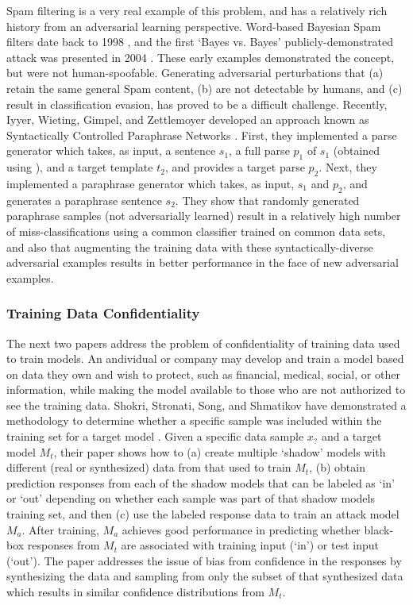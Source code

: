 \documentclass[11pt]{article}
\begin{document}
Spam filtering is a very real example of this problem, and has a relatively rich history from an adversarial learning perspective.  Word-based Bayesian Spam filters date back to 1998 \cite{sahami1998bayesian}, and the first `Bayes vs. Bayes' publicly-demonstrated attack was presented in 2004 \cite{graham2004beat}.  These early examples demonstrated the concept, but were not human-spoofable.  Generating adversarial perturbations that (a) retain the same general Spam content, (b) are not detectable by humans, and (c) result in classification evasion, has proved to be a difficult challenge.  Recently, Iyyer, Wieting, Gimpel, and Zettlemoyer developed an approach known as Syntactically Controlled Paraphrase Networks \cite{DBLP:journals/corr/abs-1804-06059}.  First, they implemented a parse generator which takes, as input, a sentence $s_1$, a full parse $p_1$ of $s_1$ (obtained using \cite{manning2014stanford}), and a target template $t_2$, and provides a target parse $p_2$.  Next, they implemented a paraphrase generator which takes, as input, $s_1$ and $p_2$, and generates a paraphrase sentence $s_2$.  They show that randomly generated paraphrase samples (not adversarially learned) result in a relatively high number of miss-classifications using a common classifier trained on common data sets, and also that augmenting the training data with these syntactically-diverse adversarial examples results in better performance in the face of new adversarial examples.


\subsubsection{Training Data Confidentiality}

The next two papers address the problem of confidentiality of training data used to train models.  An andividual or company may develop and train a model based on data they own and wish to protect, such as financial, medical, social, or other information, while making the model available to those who are not authorized to see the training data.  Shokri, Stronati, Song, and Shmatikov have demonstrated a methodology to determine whether a specific sample was included within the training set for a target model \cite{shokri2017membership}.  Given a specific data sample $x_?$ and a target model $M_t$, their paper shows how to (a) create multiple `shadow' models with different (real or synthesized) data from that used to train $M_t$, (b) obtain prediction responses from each of the shadow models that can be labeled as `in' or `out' depending on whether each sample was part of that shadow models training set, and then (c) use the labeled response data to train an attack model $M_a$.  After training, $M_a$ achieves good performance in predicting whether black-box responses from $M_t$ are associated with training input (`in') or test input (`out').  The paper addresses the issue of bias from confidence in the responses by synthesizing the data and sampling from only the subset of that synthesized data which results in similar confidence distributions from $M_t$.
\end{document}
